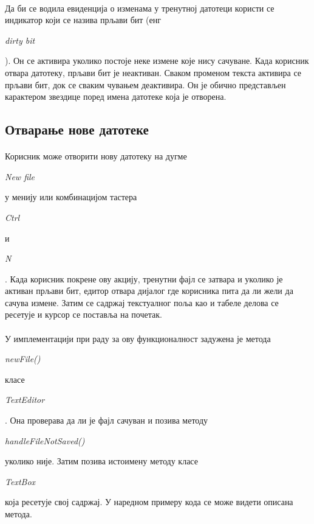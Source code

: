 \documentclass[12pt,oneside]{memoir}
\begin{document}
\paragraph{}
Да би се водила евиденција о изменама у тренутној датотеци користи
се индикатор који се назива прљави бит (енг \begin{latinica}\textit{dirty bit}\end{latinica}). Он се активира уколико постоје неке измене које нису сачуване. 
Када корисник отвара датотеку, прљави бит је неактиван.
Сваком променом текста активира се прљави бит, док се сваким
чувањем деактивира. Он је обично представљен карактером звездице поред
имена датотеке која је отворена.

\subsection{Отварање нове датотеке}
\paragraph{}
Корисник може отворити нову датотеку на дугме 
\begin{latinica}\textit{New file}\end{latinica} у менију или комбинацијом тастера
\begin{latinica}\textit{Ctrl}\end{latinica} и
\begin{latinica}\textit{N}\end{latinica}. Када корисник покрене ову акцију,
тренутни фајл се затвара и уколико је активан прљави бит, едитор отвара
дијалог где корисника пита да ли жели да сачува измене. Затим се садржај
текстуалног поља као и табеле делова се ресетује и курсор се поставља на почетак.

\paragraph{}
У имплементацији при раду за ову функционалност задужена је метода
\begin{latinica}\textit{newFile()}\end{latinica} класе
\begin{latinica}\textit{TextEditor}\end{latinica}. Она проверава да ли је фајл
сачуван и позива методу
\begin{latinica}\textit{handleFileNotSaved()}\end{latinica} 
уколико није. Затим позива истоимену методу класе \begin{latinica}\textit{TextBox}\end{latinica} која ресетује свој садржај.
У наредном примеру кода се може видети описана метода.
\end{document}
